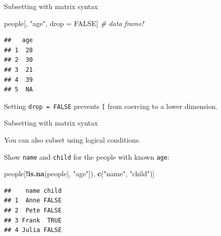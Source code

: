 \documentclass[ignorenonframetext,]{beamer}
\newenvironment{Shaded}{\begin{snugshade}}{\end{snugshade}}
\newcommand{\CommentTok}[1]{\textcolor[rgb]{0.56,0.35,0.01}{\textit{#1}}}
\newcommand{\KeywordTok}[1]{\textcolor[rgb]{0.13,0.29,0.53}{\textbf{#1}}}
\newcommand{\NormalTok}[1]{#1}
\newcommand{\OperatorTok}[1]{\textcolor[rgb]{0.81,0.36,0.00}{\textbf{#1}}}
\newcommand{\OtherTok}[1]{\textcolor[rgb]{0.56,0.35,0.01}{#1}}
\newcommand{\StringTok}[1]{\textcolor[rgb]{0.31,0.60,0.02}{#1}}
\begin{document}
\begin{frame}[fragile]{Subsetting with matrix syntax}
\protect\hypertarget{subsetting-with-matrix-syntax-3}{}

\begin{Shaded}
\begin{Highlighting}[]
\NormalTok{people[, }\StringTok{"age"}\NormalTok{, drop =}\StringTok{ }\OtherTok{FALSE}\NormalTok{] }\CommentTok{# data frame!}
\end{Highlighting}
\end{Shaded}

\begin{verbatim}
##   age
## 1  28
## 2  30
## 3  21
## 4  39
## 5  NA
\end{verbatim}

Setting \texttt{drop\ =\ FALSE} prevents \texttt{{[}} from coercing to a
lower dimension.

\end{frame}

\begin{frame}[fragile]{Subsetting with matrix syntax}
\protect\hypertarget{subsetting-with-matrix-syntax-4}{}

You can also subset using logical conditions.

Show \texttt{name} and \texttt{child} for the people with known
\texttt{age}:

\begin{Shaded}
\begin{Highlighting}[]
\NormalTok{people[}\OperatorTok{!}\KeywordTok{is.na}\NormalTok{(people[, }\StringTok{"age"}\NormalTok{]), }\KeywordTok{c}\NormalTok{(}\StringTok{"name"}\NormalTok{, }\StringTok{"child"}\NormalTok{)]}
\end{Highlighting}
\end{Shaded}

\begin{verbatim}
##    name child
## 1  Anne FALSE
## 2  Pete FALSE
## 3 Frank  TRUE
## 4 Julia FALSE
\end{verbatim}

\end{frame}
\end{document}
